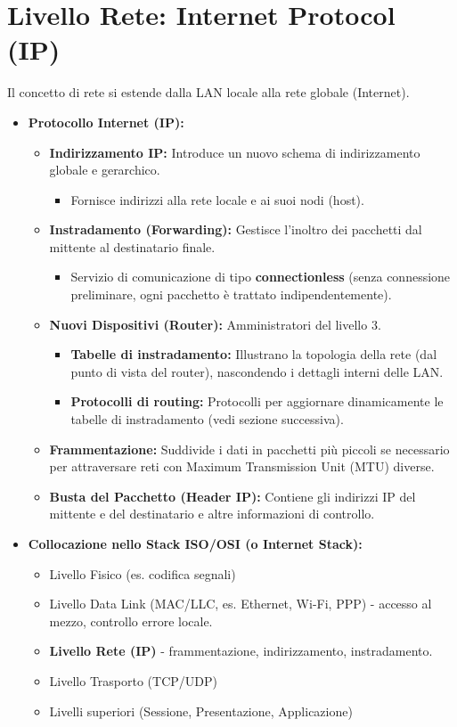 \section{Livello Rete: Internet Protocol (IP)}
Il concetto di rete si estende dalla LAN locale alla rete globale (Internet).
\begin{itemize}
    \item \textbf{Protocollo Internet (IP):}
    \begin{itemize}
        \item \textbf{Indirizzamento IP:} Introduce un nuovo schema di indirizzamento globale e gerarchico.
        \begin{itemize}
            \item Fornisce indirizzi alla rete locale e ai suoi nodi (host).
        \end{itemize}
        \item \textbf{Instradamento (Forwarding):} Gestisce l'inoltro dei pacchetti dal mittente al destinatario finale.
        \begin{itemize}
            \item Servizio di comunicazione di tipo \textbf{connectionless} (senza connessione preliminare, ogni pacchetto è trattato indipendentemente).
        \end{itemize}
        \item \textbf{Nuovi Dispositivi (Router):} Amministratori del livello 3.
        \begin{itemize}
            \item \textbf{Tabelle di instradamento:} Illustrano la topologia della rete (dal punto di vista del router), nascondendo i dettagli interni delle LAN.
            \item \textbf{Protocolli di routing:} Protocolli per aggiornare dinamicamente le tabelle di instradamento (vedi sezione successiva).
        \end{itemize}
        \item \textbf{Frammentazione:} Suddivide i dati in pacchetti più piccoli se necessario per attraversare reti con Maximum Transmission Unit (MTU) diverse.
        \item \textbf{Busta del Pacchetto (Header IP):} Contiene gli indirizzi IP del mittente e del destinatario e altre informazioni di controllo.
    \end{itemize}
    \item \textbf{Collocazione nello Stack ISO/OSI (o Internet Stack):}
    \begin{itemize}
        \item Livello Fisico (es. codifica segnali)
        \item Livello Data Link (MAC/LLC, es. Ethernet, Wi-Fi, PPP) - accesso al mezzo, controllo errore locale.
        \item \textbf{Livello Rete (IP)} - frammentazione, indirizzamento, instradamento.
        \item Livello Trasporto (TCP/UDP)
        \item Livelli superiori (Sessione, Presentazione, Applicazione)
    \end{itemize}
\end{itemize}

